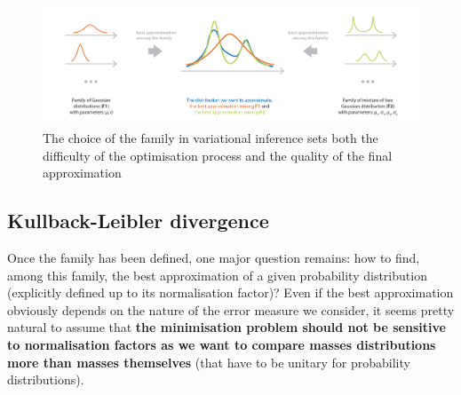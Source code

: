 \begin{figure}[h]
    \centering
\includegraphics[width=\textwidth]{pic/p05c08-snip07.png}
    \caption[The choice of the family in variational inference sets]{The choice of the family in variational inference sets both the difficulty of the optimisation process and the quality of the final approximation}
    \label{fig:p05c08-snip07}
\end{figure}

\subsection{Kullback-Leibler divergence}

Once the family has been defined, one major question remains: how to find, among this family, the best approximation of a given probability distribution (explicitly defined up to its normalisation factor)? Even if the best approximation obviously depends on the nature of the error measure we consider, it seems pretty natural to assume that \textbf{the minimisation problem should not be sensitive to normalisation factors as we want to compare masses distributions more than masses themselves} (that have to be unitary for probability distributions).

